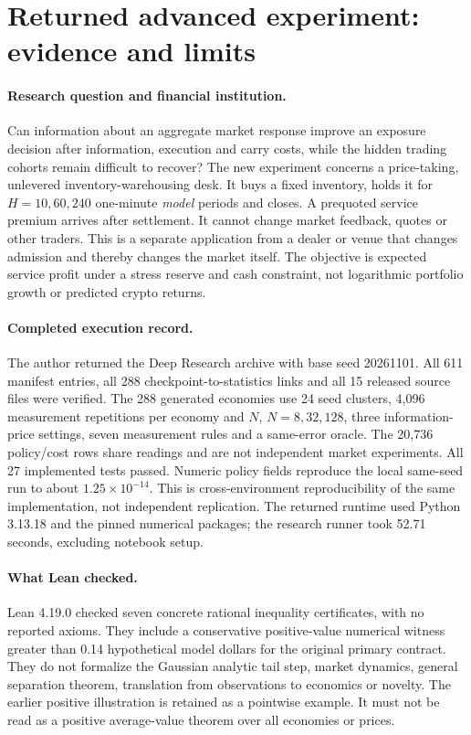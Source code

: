\clearpage
\section*{Returned advanced experiment: evidence and limits}
\begingroup
\renewcommand{\baselinestretch}{1.08}\selectfont
\paragraph{Research question and financial institution.}
Can information about an aggregate market response improve an exposure decision
after information, execution and carry costs, while the hidden trading cohorts
remain difficult to recover? The new experiment concerns a price-taking,
unlevered inventory-warehousing desk. It buys a fixed inventory, holds it for
$H=10,60,240$ one-minute \emph{model} periods and closes. A prequoted service
premium arrives after settlement. It cannot change market feedback, quotes or
other traders. This is a separate application from a dealer or venue that
changes admission and thereby changes the market itself. The objective is
expected service profit under a stress reserve and cash constraint, not
logarithmic portfolio growth or predicted crypto returns.

\paragraph{Completed execution record.}
The author returned the Deep Research archive with base seed 20261101.
All 611 manifest entries, all 288 checkpoint-to-statistics links and all 15
released source files were verified. The 288 generated economies use 24 seed
clusters, 4,096 measurement repetitions per economy and $N$, $N=8,32,128$,
three information-price settings, seven measurement rules and a same-error
oracle. The 20,736 policy/cost rows share readings and are not independent
market experiments. All 27 implemented tests passed. Numeric policy fields
reproduce the local same-seed run to about $1.25\times10^{-14}$. This is
cross-environment reproducibility of the same implementation, not independent
replication. The returned runtime used Python 3.13.18 and the pinned numerical
packages; the research runner took 52.71 seconds, excluding notebook setup.

\paragraph{What Lean checked.}
Lean 4.19.0 checked seven concrete rational inequality certificates, with no
reported axioms. They include a conservative positive-value numerical witness
greater than 0.14 hypothetical model dollars for the original primary contract.
They do not formalize the Gaussian analytic tail step, market dynamics, general
separation theorem, translation from observations to economics or novelty.
The earlier positive illustration is retained as a pointwise example. It must
not be read as a positive average-value theorem over all economies or prices.

